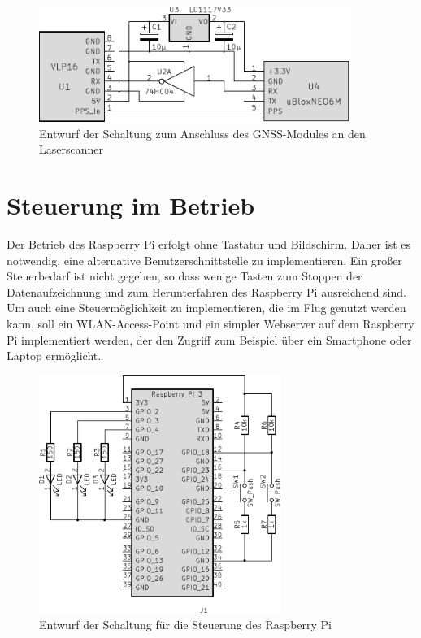 \documentclass[a4paper,12pt,bibliography=totoc, listof=totoc,titlepage,pointlessnumbers]{scrreprt}
\begin{document}
\begin{figure}[!ht]
 \centering
 \includegraphics[width=0.9\textwidth]{img/schaltplanGnss.pdf}
 \caption{Entwurf der Schaltung zum Anschluss des GNSS-Modules an den Laser\-scan\-ner}
 \label{abb:schaltplan}
\end{figure}

\section{Steuerung im Betrieb}
\label{s:steuermodul}
Der Betrieb des Rasp\-berry Pi erfolgt ohne Tastatur und Bildschirm. Daher ist es notwendig, eine alternative Benutzerschnittstelle zu implementieren. Ein großer Steuerbedarf ist nicht gegeben, so dass wenige Tasten zum Stoppen der Datenaufzeichnung und zum Herunterfahren des Rasp\-berry Pi ausreichend sind. Um auch eine Steuermöglichkeit zu implementieren, die im Flug genutzt werden kann, soll ein WLAN-Access-Point und ein simpler Webserver auf dem Rasp\-berry Pi implementiert werden, der den Zugriff zum Beispiel über ein Smartphone oder Laptop ermöglicht.

\begin{figure}[!ht]
 \centering
 \includegraphics[width=0.7\textwidth]{img/schaltplanRasp.pdf}
 \caption{Entwurf der Schaltung für die Steuerung des Rasp\-berry Pi}
 \label{abb:steuerung}
\end{figure}
\end{document}
